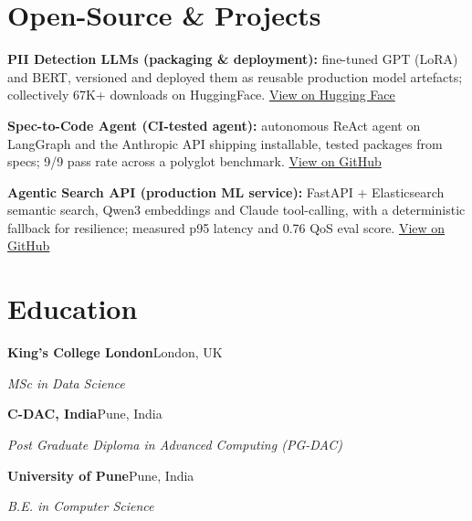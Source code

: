 \documentclass[10pt,a4paper]{article}
\begin{document}
\section{Open-Source \& Projects}
\begin{tight}
  \item \textbf{PII Detection LLMs (packaging \& deployment):} fine-tuned GPT (LoRA) and BERT, versioned and deployed them as reusable production model artefacts; collectively 67K+ downloads on HuggingFace. \href{https://huggingface.co/ab-ai/pii_model}{View on Hugging Face}
  \item \textbf{Spec-to-Code Agent (CI-tested agent):} autonomous ReAct agent on LangGraph and the Anthropic API shipping installable, tested packages from specs; 9/9 pass rate across a polyglot benchmark. \href{https://github.com/abhijeetscode/Spec-to-Code-Agent}{View on GitHub}
  \item \textbf{Agentic Search API (production ML service):} FastAPI + Elasticsearch semantic search, Qwen3 embeddings and Claude tool-calling, with a deterministic fallback for resilience; measured p95 latency and 0.76 QoS eval score. \href{https://github.com/abhijeetscode/search-agent}{View on GitHub}
\end{tight}

\section{Education}
{\color{company}\bfseries King's College London}\hfill {\color{muted}London, UK}\par
{\itshape MSc in Data Science}\par\vspace{2pt}
{\color{company}\bfseries C-DAC, India}\hfill {\color{muted}Pune, India}\par
{\itshape Post Graduate Diploma in Advanced Computing (PG-DAC)}\par\vspace{2pt}
{\color{company}\bfseries University of Pune}\hfill {\color{muted}Pune, India}\par
{\itshape B.E. in Computer Science}\par
\end{document}
